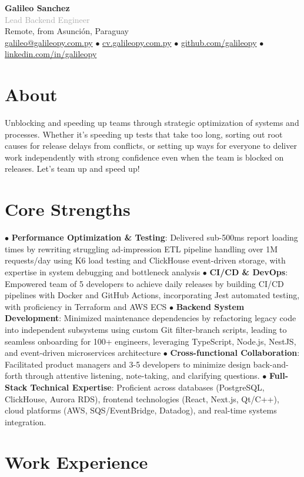 \documentclass[10pt,a4paper]{article}
\newcommand{\cvheader}[5]{
  \begin{center}
    {\Large \textbf{#1}}\\[0.1em]
    {\normalsize \textcolor{darkgray}{#2}}\\[0.3em]
    
    \footnotesize \textcolor{mediumgray}{#3}\\[0.2em]
    
    \footnotesize
    \href{mailto:#4}{#4} $\bullet$ \href{https://#5}{#5} $\bullet$ 
    \href{https://github.com/galileopy}{github.com/galileopy} $\bullet$ 
    \href{https://www.linkedin.com/in/galileopy}{linkedin.com/in/galileopy}
  \end{center}
  \vspace{0.3em}
}
\begin{document}
\cvheader{Galileo Sanchez}{Lead Backend Engineer}{Remote, from Asunción, Paraguay}{galileo@galileopy.com.py}{cv.galileopy.com.py}

\section{About}
{\footnotesize Unblocking and speeding up teams through strategic optimization of systems and processes. Whether it's speeding up tests that take too long, sorting out root causes for release delays from conflicts, or setting up ways for everyone to deliver work independently with strong confidence even when the team is blocked on releases. Let's team up and speed up!}

\section{Core Strengths}
{\footnotesize
	$\bullet$ \textbf{Performance Optimization \& Testing}: Delivered sub-500ms report loading times by rewriting struggling ad-impression ETL pipeline handling over 1M requests/day using K6 load testing and ClickHouse event-driven storage, with expertise in system debugging and bottleneck analysis $\bullet$ \textbf{CI/CD \& DevOps}: Empowered team of 5 developers to achieve daily releases by building CI/CD pipelines with Docker and GitHub Actions, incorporating Jest automated testing, with proficiency in Terraform and AWS ECS $\bullet$ \textbf{Backend System Development}: Minimized maintenance dependencies by refactoring legacy code into independent subsystems using custom Git filter-branch scripts, leading to seamless onboarding for 100+ engineers, leveraging TypeScript, Node.js, NestJS, and event-driven microservices architecture $\bullet$ \textbf{Cross-functional Collaboration}: Facilitated product managers and 3-5 developers to minimize design back-and-forth through attentive listening, note-taking, and clarifying questions. $\bullet$ \textbf{Full-Stack Technical Expertise}: Proficient across databases (PostgreSQL, ClickHouse, Aurora RDS), frontend technologies (React, Next.js, Qt/C++), cloud platforms (AWS, SQS/EventBridge, Datadog), and real-time systems integration.
}

\section{Work Experience}
\end{document}
